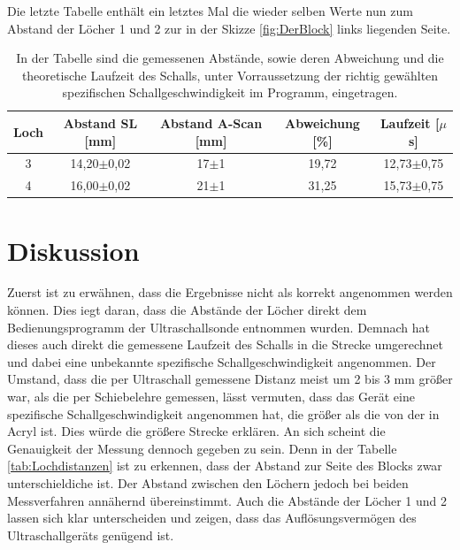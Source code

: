 \documentclass[titlepage = firstcover]{scrartcl}
\begin{document}
            \FloatBarrier
            \noindent

            Die letzte Tabelle enthält ein letztes Mal die wieder selben Werte nun zum Abstand der Löcher 1 und 2 zur in der Skizze \ref{fig:DerBlock} links liegenden Seite.

            \begin{table}[h]
              \centering
              \caption{In der Tabelle sind die gemessenen Abstände, sowie deren Abweichung und die theoretische Laufzeit des Schalls, unter Vorraussetzung der richtig gewählten spezifischen Schallgeschwindigkeit im Programm, eingetragen.}
              \label{tab:Auflösung2}

              \begin{tabular}{c c c c c}
                  \toprule
                  {Loch} & {Abstand SL [mm]} & {Abstand A-Scan [mm]} & {Abweichung [\%]} & {Laufzeit [$\mu$s]}  \\
                  \midrule
                  3   &   14,20$\pm$0,02   &   17$\pm$1  &   19,72    &   12,73$\pm$0,75   \\
                  4   &   16,00$\pm$0,02   &   21$\pm$1  &   31,25    &   15,73$\pm$0,75   \\   
                  \bottomrule
              \end{tabular}

            \end{table}

            \FloatBarrier
            \noindent

    \newpage
    \section{Diskussion}
      Zuerst ist zu erwähnen, dass die Ergebnisse nicht als korrekt angenommen werden können. Dies iegt daran, dass die Abstände der Löcher direkt dem Bedienungsprogramm der Ultraschallsonde
      entnommen wurden. Demnach hat dieses auch direkt die gemessene Laufzeit des Schalls in die Strecke umgerechnet und dabei eine unbekannte spezifische Schallgeschwindigkeit angenommen. Der 
      Umstand, dass die per Ultraschall gemessene Distanz meist um 2 bis 3 mm größer war, als die per Schiebelehre gemessen, lässt vermuten, dass das Gerät eine spezifische Schallgeschwindigkeit
      angenommen hat, die größer als die von der in Acryl ist. Dies würde die größere Strecke erklären. An sich scheint die Genauigkeit der Messung dennoch gegeben zu sein. Denn in der Tabelle
      \ref{tab:Lochdistanzen} ist zu erkennen, dass der Abstand zur Seite des Blocks zwar unterschieldiche ist. Der Abstand zwischen den Löchern jedoch bei beiden Messverfahren
      annähernd übereinstimmt. Auch die Abstände der Löcher 1 und 2 lassen sich klar unterscheiden und zeigen, dass das Auflösungsvermögen des Ultraschallgeräts genügend ist. 
      

    
\end{document}
